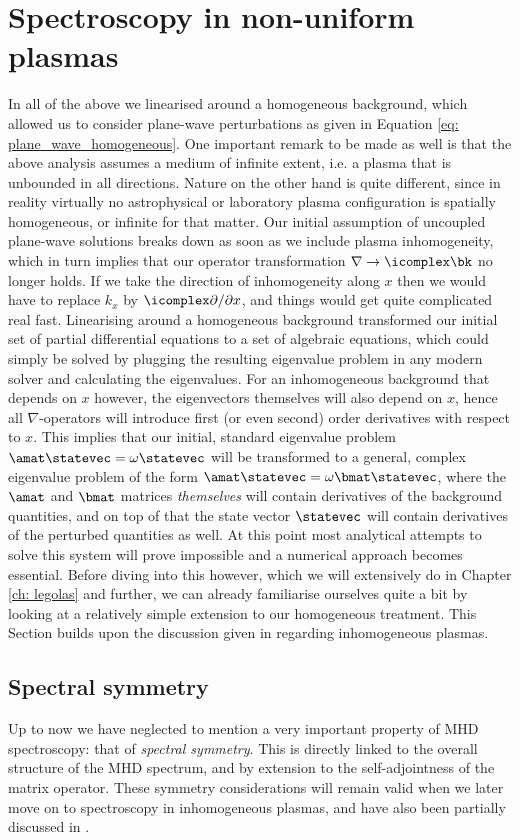 \section{Spectroscopy in non-uniform plasmas}
In all of the above we linearised around a homogeneous background, which allowed us to consider plane-wave perturbations as given in Equation \eqref{eq: plane_wave_homogeneous}. One important remark to be made as well is that the above analysis assumes a medium of infinite extent, i.e. a plasma that is unbounded in all directions.
Nature on the other hand is quite different, since in reality virtually no astrophysical or laboratory plasma configuration is spatially homogeneous, or infinite for that matter. Our initial assumption of uncoupled plane-wave solutions breaks down as soon as we include plasma inhomogeneity, which in turn implies that our operator transformation $\nabla \rightarrow \icomplex\bk$ no longer holds. If we take the direction of inhomogeneity along $x$ then we would have to replace $k_x$ by $\icomplex\partial / \partial x$, and things would get quite complicated real fast. Linearising around a homogeneous background transformed our initial set of partial differential equations to a set of algebraic equations, which could simply be solved by plugging the resulting eigenvalue problem in any modern solver and calculating the eigenvalues. For an inhomogeneous background that depends on $x$ however, the eigenvectors themselves will also depend on $x$, hence all $\nabla$-operators will introduce first (or even second) order derivatives with respect to $x$. This implies that our initial, standard eigenvalue problem $\amat \statevec = \omega \statevec$ will be transformed to a general, complex eigenvalue problem of the form $\amat \statevec = \omega \bmat \statevec$, where the $\amat$ and $\bmat$ matrices \emph{themselves} will contain derivatives of the background quantities, and on top of that the state vector $\statevec$ will contain derivatives of the perturbed quantities as well. At this point most analytical attempts to solve this system will prove impossible and a numerical approach becomes essential.
Before diving into this however, which we will extensively do in Chapter \ref{ch: legolas} and further, we can already familiarise ourselves quite a bit by looking at a relatively simple extension to our homogeneous treatment. This Section builds upon the discussion given in \citet{book_MHD} regarding inhomogeneous plasmas.

\subsection{Spectral symmetry}
Up to now we have neglected to mention a very important property of MHD spectroscopy: that of \emph{spectral symmetry}. This is directly linked to the overall structure of the MHD spectrum, and by extension to the self-adjointness of the matrix operator. These symmetry considerations will remain valid when we later move on to spectroscopy in inhomogeneous plasmas, and have also been partially discussed in \citet{claes2020_legolas}.

